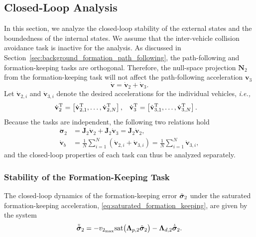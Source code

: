\subsection{Closed-Loop Analysis}\label{sec:closed_loop}
In this section, we analyze the closed-loop stability of the external states and the boundedness of the internal states. We assume that the inter-vehicle collision avoidance task is inactive for the analysis. As discussed in Section~\ref{sec:background_formation_path_following}, the path-following and formation-keeping tasks are orthogonal. Therefore, the null-space projection $\mathbf{N}_2$ from the formation-keeping task will not affect the path-following acceleration $\mathbf{v}_3$
\begin{equation}\label{eq:commanded_acceleration_inactive_colav}
    \dot{\mathbf{v}} = \dot{\mathbf{v}}_2 + \dot{\mathbf{v}}_3.
\end{equation}
Let $\dot{\mathbf{v}}_{2,i}$ and $\dot{\mathbf{v}}_{3,i}$ denote the desired accelerations for the individual vehicles, \emph{i.e.,}
\begin{align}
    \dot{\mathbf{v}}_{2}^{\mathrm{T}} &= \left[\dot{\mathbf{v}}_{2,1}^{\mathrm{T}}, \ldots, \dot{\mathbf{v}}_{2,N}^{\mathrm{T}}\right], &
    \dot{\mathbf{v}}_{3}^{\mathrm{T}} &= \left[\dot{\mathbf{v}}_{3,1}^{\mathrm{T}}, \ldots, \dot{\mathbf{v}}_{3,N}^{\mathrm{T}}\right].
\end{align}
Because the tasks are independent, the following two relations hold
\begin{align}
    \ddot{\bm{\sigma}}_2 &= \mathbf{J}_2\dot{\mathbf{v}}_2 + \mathbf{J}_2\dot{\mathbf{v}}_3 = \mathbf{J}_2\dot{\mathbf{v}}_2,\\
    \dot{\mathbf{v}}_b &= \frac{1}{N}\sum_{i=1}^N (\dot{\mathbf{v}}_{2,i} + \dot{\mathbf{v}}_{3,i}) = \frac{1}{N}\sum_{i=1}^N \dot{\mathbf{v}}_{3,i},
\end{align}
and the closed-loop properties of each task can thus be analyzed separately.


\subsubsection{Stability of the Formation-Keeping Task}
The closed-loop dynamics of the formation-keeping error $\Tilde{\bm{\sigma}}_2$ under the saturated formation-keeping acceleration, \eqref{eq:saturated_formation_keeping}, are given by the system
\begin{equation}\label{eq:task_2_dynamics}
    \ddot{\Tilde{\bm{\sigma}}}_2 = - v_{2_{\max}}\mathrm{sat}\bigl(\mathbf{\Lambda}_{p,2}\Tilde{\bm{\sigma}}_2\bigr) - \mathbf{\Lambda}_{d,2} \dot{\Tilde{\bm{\sigma}}}_2.
\end{equation}


